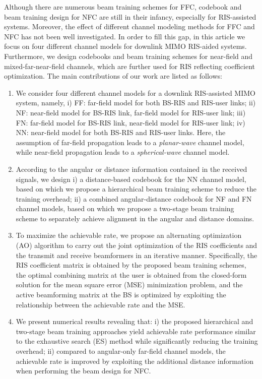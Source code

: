 \documentclass[lettersize, journal]{IEEEtran}
\begin{document}
Although there are numerous beam training schemes for FFC, codebook and beam training design for NFC are still in their infancy, especially for RIS-assisted systems.
Moreover, the effect of different channel modeling methods for FFC and NFC has not been well investigated.
In order to fill this gap, in this article we focus on four different channel models for downlink MIMO RIS-aided systems. 
Furthermore, we design codebooks and beam training schemes for near-field and mixed-far-near-field channels, which are further used for RIS reflecting coefficient optimization.
The main contributions of our work are listed as follows:
\begin{enumerate} 
  \item We consider four different channel models for a downlink RIS-assisted MIMO system, namely, i) FF: far-field model for both BS-RIS and RIS-user links; ii) NF: near-field model for BS-RIS link, far-field model for RIS-user link; iii) FN: far-field model for BS-RIS link, near-field model for RIS-user link; iv) NN: near-field model for both BS-RIS and RIS-user links. 
   Here, the assumption of far-field propagation leads to a {\textit{planar-wave}} channel model, while near-field propagation leads to a {\textit{spherical-wave}} channel model.
  \item According to the angular or distance information contained in the received signals, we design i) a distance-based codebook for the NN channel model, based on which we propose a hierarchical beam training scheme to reduce the training overhead; ii) a combined angular-distance codebook for NF and FN channel models, based on which we propose a two-stage beam training scheme to separately achieve alignment in the angular and distance domains.
  \item To maximize the achievable rate, we propose an alternating optimization (AO) algorithm to carry out the joint optimization of the RIS coefficients and the transmit and receive beamformers in an iterative manner. Specifically, the RIS coefficient matrix is obtained by the proposed beam training schemes, the optimal combining matrix at the user is obtained from the closed-form solution for the mean square error (MSE) minimization problem, and the active beamforming matrix at the BS is optimized by exploiting the relationship between the achievable rate and the MSE. 
  \item We present numerical results revealing that: i) the proposed hierarchical and two-stage beam training approaches yield achievable rate performance similar to the exhaustive search (ES) method while significantly reducing the training overhead; ii) compared to angular-only far-field channel models, the achievable rate is improved by exploiting the additional distance information when performing the beam design for NFC.   
\end{enumerate}
\end{document}
